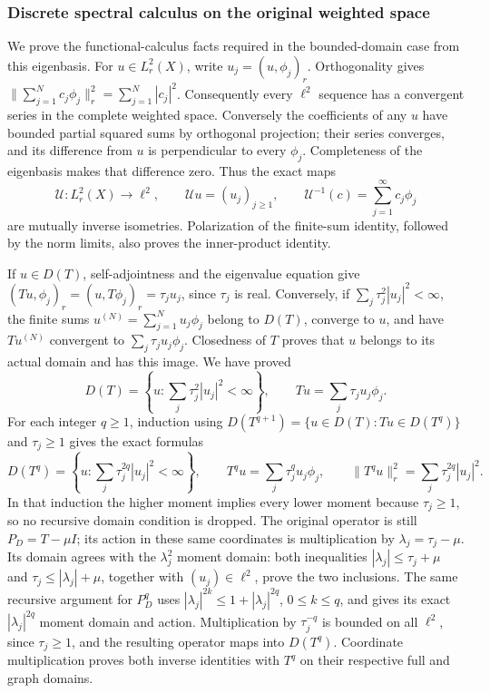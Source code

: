 \documentclass[
  11pt,
]{article}
\makeatletter
\let\ReaderOriginalAnchorStart\hyper@anchorstart
\let\ReaderOriginalAnchorEnd\hyper@anchorend
\let\ReaderPendingAliases\@empty
\def\ReaderArmAliases#1{\gdef\ReaderPendingAliases{#1}}
\def\hyper@anchorstart#1{\ReaderIfNativeAnchorTF{#1}{\ReaderPendingAliases\global\let\ReaderPendingAliases\@empty}{}\ReaderOriginalAnchorStart{#1}}
\makeatother
\begin{document}
\ReaderArmAliases{\ReaderOriginalAnchorStart{discrete-spectral-calculus-on-the-original-weighted-space}\ReaderOriginalAnchorEnd}
\subsubsection{Discrete spectral calculus on the original weighted
space}\label{discrete-spectral-calculus-on-the-original-weighted-space}

We prove the functional-calculus facts required in the bounded-domain
case from this eigenbasis. For \(u\in L^2_r(X)\), write
\(u_j=(u,\phi_j)_r\). Orthogonality gives
\(\|\sum_{j=1}^N c_j\phi_j\|_r^2=\sum_{j=1}^N|c_j|^2\). Consequently
every \(\ell^2\) sequence has a convergent series in the complete
weighted space. Conversely the coefficients of any \(u\) have bounded
partial squared sums by orthogonal projection; their series converges,
and its difference from \(u\) is perpendicular to every \(\phi_j\).
Completeness of the eigenbasis makes that difference zero. Thus the
exact maps \[
 \mathcal U:L^2_r(X)\longrightarrow\ell^2,\qquad
 \mathcal Uu=(u_j)_{j\geq1},\qquad
 \mathcal U^{-1}(c)=\sum_{j=1}^{\infty}c_j\phi_j
 \tag{DSP16a}
\] are mutually inverse isometries. Polarization of the finite-sum
identity, followed by the norm limits, also proves the inner-product
identity.

If \(u\in D(T)\), self-adjointness and the eigenvalue equation give
\((Tu,\phi_j)_r=(u,T\phi_j)_r=\tau_j u_j\), since \(\tau_j\) is real.
Conversely, if \(\sum_j\tau_j^2|u_j|^2<\infty\), the finite sums
\(u^{(N)}=\sum_{j=1}^N u_j\phi_j\) belong to \(D(T)\), converge to
\(u\), and have \(Tu^{(N)}\) convergent to \(\sum_j\tau_j u_j\phi_j\).
Closedness of \(T\) proves that \(u\) belongs to its actual domain and
has this image. We have proved \[
 D(T)=\left\{u:\sum_j\tau_j^2|u_j|^2<\infty\right\},\qquad
 Tu=\sum_j\tau_j u_j\phi_j.
 \tag{DSP16b}
\] For each integer \(q\geq1\), induction using
\(D(T^{q+1})=\{u\in D(T):Tu\in D(T^q)\}\) and \(\tau_j\geq1\) gives the
exact formulas \[
 D(T^q)=\left\{u:\sum_j\tau_j^{2q}|u_j|^2<\infty\right\},\qquad
 T^qu=\sum_j\tau_j^q u_j\phi_j,\qquad
 \|T^qu\|_r^2=\sum_j\tau_j^{2q}|u_j|^2.
 \tag{DSP16c}
\] In that induction the higher moment implies every lower moment
because \(\tau_j\geq1\), so no recursive domain condition is dropped.
The original operator is still \(P_D=T-\mu I\); its action in these same
coordinates is multiplication by \(\lambda_j=\tau_j-\mu\). Its domain
agrees with the \(\lambda_j^2\) moment domain: both inequalities
\(|\lambda_j|\leq\tau_j+\mu\) and \(\tau_j\leq|\lambda_j|+\mu\),
together with \((u_j)\in\ell^2\), prove the two inclusions. The same
recursive argument for \(P_D^q\) uses
\(|\lambda_j|^{2k}\leq1+|\lambda_j|^{2q}\), \(0\leq k\leq q\), and gives
its exact \(|\lambda_j|^{2q}\) moment domain and action. Multiplication
by \(\tau_j^{-q}\) is bounded on all \(\ell^2\), since \(\tau_j\geq1\),
and the resulting operator maps into \(D(T^q)\). Coordinate
multiplication proves both inverse identities with \(T^q\) on their
respective full and graph domains.
\end{document}
